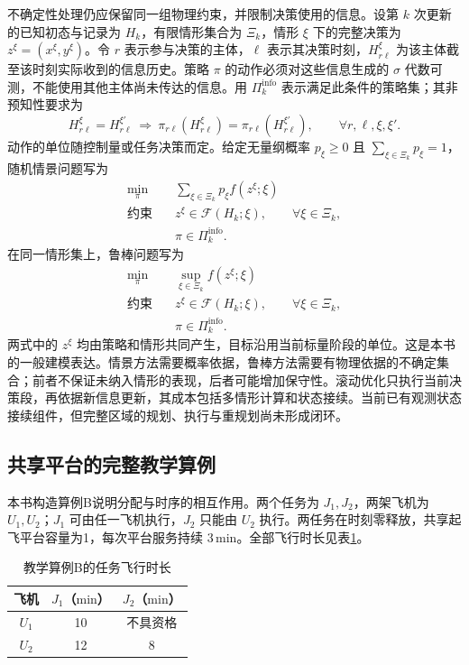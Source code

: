 不确定性处理仍应保留同一组物理约束，并限制决策使用的信息。设第 $k$ 次更新的已知初态与记录为 $H_k$，有限情形集合为 $\Xi_k$，情形 $\xi$ 下的完整决策为 $z^\xi=(x^\xi,y^\xi)$。令 $r$ 表示参与决策的主体，$\ell$ 表示其决策时刻，$H_{r\ell}^\xi$ 为该主体截至该时刻实际收到的信息历史。策略 $\pi$ 的动作必须对这些信息生成的 $\sigma$ 代数可测，不能使用其他主体尚未传达的信息。用 $\Pi_k^{\mathrm{info}}$ 表示满足此条件的策略集；其非预知性要求为
\begin{equation}
\label{s0309:nonanticipativity}
H_{r\ell}^{\xi}=H_{r\ell}^{\xi'}
\ \Longrightarrow\ 
\pi_{r\ell}(H_{r\ell}^{\xi})=
\pi_{r\ell}(H_{r\ell}^{\xi'}),
\qquad \forall r,\ell,\xi,\xi'.
\end{equation}
动作的单位随控制量或任务决策而定。给定无量纲概率 $p_\xi\geq0$ 且 $\sum_{\xi\in\Xi_k}p_\xi=1$，随机情景问题写为
\begin{equation}
\label{s0309:scenario}
\begin{aligned}
\min_{\pi}\quad &\sum_{\xi\in\Xi_k}p_\xi f(z^\xi;\xi)\\
\text{约束}\quad &z^\xi\in\mathcal F(H_k;\xi),\qquad \forall\xi\in\Xi_k,\\
&\pi\in\Pi_k^{\mathrm{info}}.
\end{aligned}
\end{equation}
在同一情形集上，鲁棒问题写为
\begin{equation}
\label{s0309:robust}
\begin{aligned}
\min_{\pi}\quad &\sup_{\xi\in\Xi_k}f(z^\xi;\xi)\\
\text{约束}\quad &z^\xi\in\mathcal F(H_k;\xi),\qquad \forall\xi\in\Xi_k,\\
&\pi\in\Pi_k^{\mathrm{info}}.
\end{aligned}
\end{equation}
两式中的 $z^\xi$ 均由策略和情形共同产生，目标沿用当前标量阶段的单位。这是本书的一般建模表达。情景方法需要概率依据，鲁棒方法需要有物理依据的不确定集合；前者不保证未纳入情形的表现，后者可能增加保守性。滚动优化只执行当前决策段，再依据新信息更新，其成本包括多情形计算和状态接续。当前已有观测状态接续组件，但完整区域的规划、执行与重规划尚未形成闭环。

\subsection{共享平台的完整教学算例}

本书构造算例B说明分配与时序的相互作用。两个任务为 $J_1,J_2$，两架飞机为 $U_1,U_2$；$J_1$ 可由任一飞机执行，$J_2$ 只能由 $U_2$ 执行。两任务在时刻零释放，共享起飞平台容量为1，每次平台服务持续 $3\,\mathrm{min}$。全部飞行时长见表\ref{s0309:parameters}。
\begin{table}[htbp]
\centering
\caption{教学算例B的任务飞行时长}
\label{s0309:parameters}
\begin{tabular}{ccc}
\toprule
飞机 & $J_1$（$\mathrm{min}$） & $J_2$（$\mathrm{min}$）\\
\midrule
$U_1$ & 10 & 不具资格\\
$U_2$ & 12 & 8\\
\bottomrule
\end{tabular}
\end{table}

